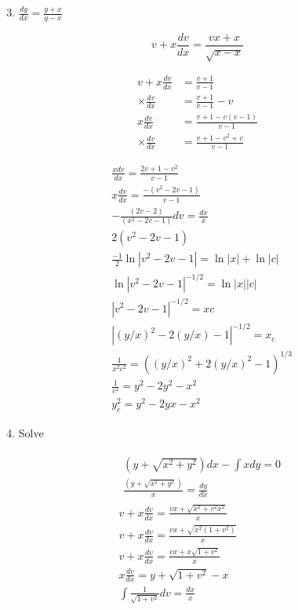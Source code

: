 \documentclass[10pt]{article}
\begin{document}
\begin{enumerate}
  \setcounter{enumi}{2}
  \item $\frac{d y}{d x}=\frac{y+x}{y-x}$
\end{enumerate}

$$
v+x \frac{d v}{d x}=\frac{v x+x}{\sqrt{x-x}}
$$

$$
\begin{aligned}
v+x \frac{d v}{d x} & =\frac{v+1}{v-1} \\
\times \frac{d v}{d x} & =\frac{v+1}{v-1}-v \\
x \frac{d v}{d x} & =\frac{v+1-v(v-1)}{v-1} \\
\times \frac{d v}{d x} & =\frac{v+1-v^{2}+v}{v-1}
\end{aligned}
$$

$$
\begin{aligned}
& \frac{x d v}{d x}=\frac{2 v+1-v^{2}}{v-1} \\
& x \frac{d v}{d x}=\frac{-\left(v^{2}-2 v-1\right)}{v-1} \\
& -\frac{(2 v-2)}{\left(x^{2}-2 v-1\right)} d v=\frac{d x}{x} \\
& 2\left(v^{2}-2 v-1\right) \\
& \frac{-1}{2} \ln \left|v^{2}-2 v-1\right|=\ln |x|+\ln |c| \\
& \ln \left|v^{2}-2 v-1\right|^{-1 / 2}=\ln |x||c| \\
& \left|v^{2}-2 v-1\right|^{-1 / 2}=x c \\
& \left|(y / x)^{2}-2(y / x)-1\right|^{-1 / 2}=x_{c} \\
& \frac{1}{x^{2} c^{2}}=\left((y / x)^{2}+2(y / x)^{2}-1\right)^{1 / 3} \\
& \frac{1}{c^{2}}=y^{2}-2 y^{2}-x^{2} \\
& y_{c}^{2}=y^{2}-2 y x-x^{2}
\end{aligned}
$$

\begin{enumerate}
  \setcounter{enumi}{3}
  \item Solve
\end{enumerate}

$$
\begin{aligned}
& \begin{array}{c}
\left(y+\sqrt{x^{2}+y^{2}}\right) d x-\int x d y=0 \\
\frac{\left(y+\sqrt{x^{2}+y^{2}}\right)}{x}=\frac{d y}{d x}
\end{array} \\
& v+x \frac{d v}{d x}=\frac{v x+\sqrt{x^{2}+v^{2} x^{2}}}{x} \\
& v+x \frac{d v}{d x}=\frac{v x+\sqrt{x^{2}\left(1+v^{2}\right)}}{x} \\
& v+x \frac{d v}{d x}=\frac{v x+x \sqrt{1+v^{2}}}{x} \\
& x \frac{d v}{d x}=y+\sqrt{1+v^{2}}-x \\
& \int \frac{1}{\sqrt{1+v^{2}}} d v=\frac{d x}{x}
\end{aligned}
$$
\end{document}

